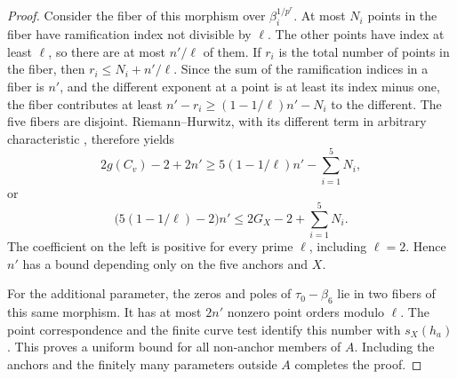 \begin{proof}
Consider the fiber of this morphism over $\beta_i^{1/p^r}$.
At most $N_i$ points in the fiber have ramification index not divisible
by $\ell$.  The other points have index at least $\ell$, so there are
at most $n'/\ell$ of them.  If $r_i$ is the total number of points
in the fiber, then
$r_i\le N_i+n'/\ell$.
Since the sum of the ramification indices in a fiber is $n'$, and
the different exponent at a point is at least its index minus one,
the fiber contributes at least
$n'-r_i\ge(1-1/\ell)n'-N_i$ to the different.
The five fibers are disjoint.  Riemann--Hurwitz, with its different term
in arbitrary characteristic \cite[Lemma~53.12.4, Tag~0C1F]{Stacks},
therefore yields
\[
 2g(C_v)-2+2n'
   \ge 5(1-1/\ell)n'-\sum_{i=1}^5N_i,
\]
or
\begin{equation}\label{eq:support-five-fibers}
 \bigl(5(1-1/\ell)-2\bigr)n'
       \le 2G_X-2+\sum_{i=1}^5N_i.
\end{equation}
The coefficient on the left is positive for every prime $\ell$,
including $\ell=2$.  Hence $n'$ has a bound depending only on the five
anchors and $X$.

For the additional parameter, the zeros and poles of
$\tau_0-\beta_6$ lie in two fibers of this same morphism.
It has at most $2n'$ nonzero point orders modulo $\ell$.
The point correspondence and the finite curve test identify this
number with $s_X(h_a)$.  This proves a uniform bound for all
non-anchor members of $A$.  Including the anchors and the finitely
many parameters outside $A$ completes the proof.
\end{proof}
